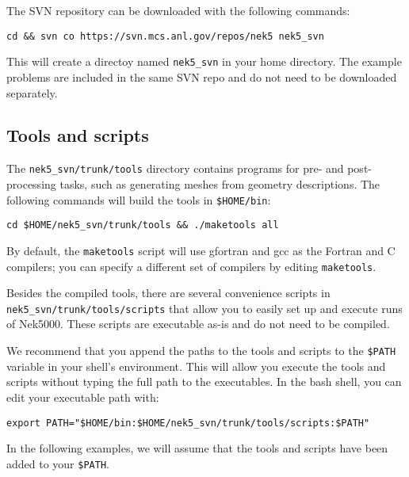 The SVN repository can be downloaded with the following commands:
\begin{verbatim}
cd && svn co https://svn.mcs.anl.gov/repos/nek5 nek5_svn
\end{verbatim}
This will create a directoy named {\tt nek5\_svn} in your home directory.  The
example problems are included in the same SVN repo and do not need to be downloaded separately.

\subsection{Tools and scripts}
The {\tt nek5\_svn/trunk/tools} directory contains programs for pre- and
post-processing tasks, such as generating meshes from geometry descriptions.  The following commands will build the tools in {\tt \$HOME/bin}:
\begin{verbatim}
cd $HOME/nek5_svn/trunk/tools && ./maketools all
\end{verbatim}
By default, the {\tt maketools} script will use gfortran and gcc as the
Fortran and C compilers; you can specify a different set of compilers by
editing {\tt maketools}.  

Besides the compiled tools, there are several convenience scripts in {\tt
nek5\_svn/trunk/tools/scripts} that allow you to easily set up and execute runs
of Nek5000.  These scripts are executable as-is and do not need to be compiled. 

We recommend that you append the paths to the tools and scripts to the {\tt \$PATH}
variable in your shell's environment.  This will allow you execute the tools
and scripts without typing the full path to the executables.  In the bash
shell, you can edit your executable path with:
\begin{verbatim}
export PATH="$HOME/bin:$HOME/nek5_svn/trunk/tools/scripts:$PATH"
\end{verbatim}
In the following examples, we will assume that the tools and scripts have been
added to your {\tt \$PATH}.
